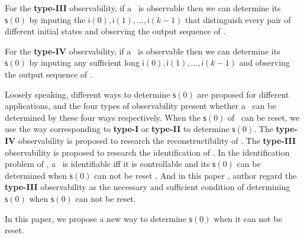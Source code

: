  For the {\bf type-III} observability, if a \BCN\ is observable then we can determine its $\mathsf{s}(0)$ by inputing the $\mathsf{i}(0),\mathsf{i}(1),\ldots,\mathsf{i}(k-1)$ that distinguish every pair of different initial states and observing the output sequence of \BCN.

For the {\bf type-IV} observability, if a \BCN\ is observable then we can determine its $\mathsf{s}(0)$ by inputing any sufficient long $\mathsf{i}(0),\mathsf{i}(1),\ldots,\mathsf{i}(k-1)$ and observing the output sequence of \BCN.

Loosely speaking, different ways to determine $\mathsf{s}(0)$ are proposed for different applications, and the four types of observability present whether a \BCN\ can be determined by these four ways respectively. When the $\mathsf{s}(0)$ of \BCN\ can be reset, we use the way corresponding to {\bf type-I} or {\bf type-II} to determine $\mathsf{s}(0)$. The {\bf type-IV} observability is proposed to research the reconstructibility of \BCN. The {\bf type-III} observability is proposed to research the identification of \BCN. In the identification problem of \BCNs, a \BCN\ is identifiable iff it is controllable and its $\mathsf{s}(0)$ can be determined when $\mathsf{s}(0)$ can not be reset \cite{Cheng2011Identification}. And in this paper \cite{Cheng2011Identification}, author regard the {\bf type-III} observability as the necessary and sufficient condition of determining $\mathsf{s}(0)$ when $\mathsf{s}(0)$ can not be reset. %

In this paper, we propose a new way to determine $\mathsf{s}(0)$ when it can not be reset.%


